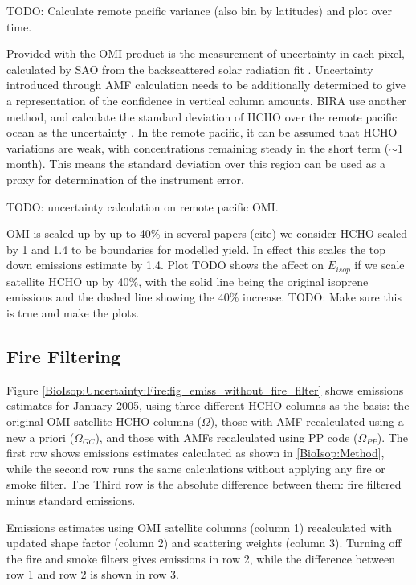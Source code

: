     TODO: Calculate remote pacific variance (also bin by latitudes) and plot over time. 
    
    
    Provided with the OMI product is the measurement of uncertainty in each pixel, calculated by SAO from the backscattered solar radiation fit \parencite{Abad2015,Abad2016}.
    Uncertainty introduced through AMF calculation needs to be additionally determined to give a representation of the confidence in vertical column amounts.
    BIRA use another method, and calculate the standard deviation of HCHO over the remote pacific ocean as the uncertainty \parencite{DeSmedt2012, DeSmedt2015}.
    In the remote pacific, it can be assumed that HCHO variations are weak, with concentrations remaining steady in the short term ($\sim 1$ month).
    This means the standard deviation over this region can be used as a proxy for determination of the instrument error.
    
    
    TODO: uncertainty calculation on remote pacific OMI.
    
    OMI is scaled up by up to 40\% in several papers (cite) we consider HCHO scaled by 1 and 1.4 to be boundaries for modelled yield.
    In effect this scales the top down emissions estimate by 1.4.
    Plot TODO shows the affect on $E_{isop}$ if we scale satellite HCHO up by 40\%, with the solid line being the original isoprene emissions and the dashed line showing the 40\% increase. TODO: Make sure this is true and make the plots.
    
  \subsection{Fire Filtering}
    
    Figure \ref{BioIsop:Uncertainty:Fire:fig_emiss_without_fire_filter} shows emissions estimates for January 2005, using three different HCHO columns as the basis: the original OMI satellite HCHO columns ($\Omega$), those with AMF recalculated using a new a priori ($\Omega_{GC}$), and those with AMFs recalculated using PP code ($\Omega_{PP}$).
    The first row shows emissions estimates calculated as shown in \ref{BioIsop:Method}, while the second row runs the same calculations without applying any fire or smoke filter.
    The Third row is the absolute difference between them: fire filtered minus standard emissions.
    
    {Emissions estimates using OMI satellite columns (column 1) recalculated with updated shape factor (column 2) and scattering weights (column 3). Turning off the fire and smoke filters gives emissions in row 2, while the difference between row 1 and row 2 is shown in row 3.}
    {\label{BioIsop:Uncertainty:Fire:fig_emiss_without_fire_filter}}
    
